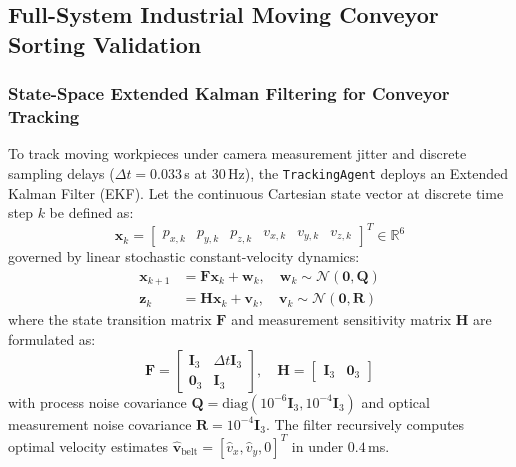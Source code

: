 \documentclass[journal]{IEEEtran}
\begin{document}
\subsection{Full-System Industrial Moving Conveyor Sorting Validation}
\subsubsection{State-Space Extended Kalman Filtering for Conveyor Tracking}
To track moving workpieces under camera measurement jitter and discrete sampling delays ($\Delta t = 0.033$\,s at $30$\,Hz), the \texttt{TrackingAgent} deploys an Extended Kalman Filter (EKF). Let the continuous Cartesian state vector at discrete time step $k$ be defined as:
\begin{equation}
\label{eq:ekf_state}
\mathbf{x}_k = \begin{bmatrix} p_{x,k} & p_{y,k} & p_{z,k} & v_{x,k} & v_{y,k} & v_{z,k} \end{bmatrix}^T \in \mathbb{R}^6
\end{equation}
governed by linear stochastic constant-velocity dynamics:
\begin{align}
\label{eq:ekf_dyn}
\mathbf{x}_{k+1} &= \mathbf{F} \mathbf{x}_k + \mathbf{w}_k, \quad \mathbf{w}_k \sim \mathcal{N}(\mathbf{0}, \mathbf{Q}) \\
\label{eq:ekf_meas}
\mathbf{z}_k &= \mathbf{H} \mathbf{x}_k + \mathbf{v}_k, \quad \mathbf{v}_k \sim \mathcal{N}(\mathbf{0}, \mathbf{R})
\end{align}
where the state transition matrix $\mathbf{F}$ and measurement sensitivity matrix $\mathbf{H}$ are formulated as:
\begin{equation}
\mathbf{F} = \begin{bmatrix} \mathbf{I}_3 & \Delta t \mathbf{I}_3 \\ \mathbf{0}_3 & \mathbf{I}_3 \end{bmatrix}, \quad \mathbf{H} = \begin{bmatrix} \mathbf{I}_3 & \mathbf{0}_3 \end{bmatrix}
\end{equation}
with process noise covariance $\mathbf{Q} = \text{diag}(10^{-6}\mathbf{I}_3, 10^{-4}\mathbf{I}_3)$ and optical measurement noise covariance $\mathbf{R} = 10^{-4}\mathbf{I}_3$. The filter recursively computes optimal velocity estimates $\hat{\mathbf{v}}_{\text{belt}} = [\hat{v}_{x}, \hat{v}_{y}, 0]^T$ in under $0.4$\,ms.
\end{document}

